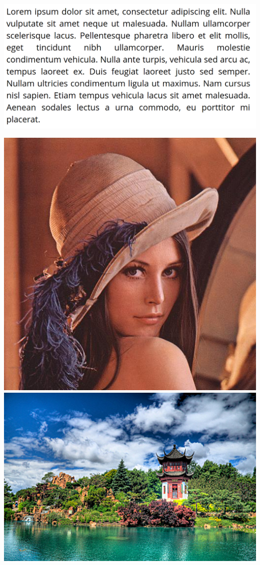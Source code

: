 \documentclass{beamer}
\begin{document}
\begin{frame}
    \begin{center}
        \includegraphics[scale=0.15]{fig/text.png}

        \vfill

        \hfill
        \includegraphics[scale=0.25]{fig/lena.jpg}
        \hfill
        \includegraphics[scale=0.25]{fig/landscape.jpg}
        \hfill
    \end{center}
\end{frame}
\end{document}
